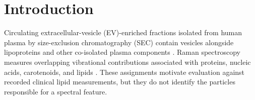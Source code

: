 \documentclass[preprint,12pt]{elsarticle}
\begin{document}
\section{Introduction}
\label{sec:introduction}

Circulating extracellular-vesicle (EV)-enriched fractions isolated from human plasma by size-exclusion chromatography (SEC) contain vesicles alongside lipoproteins and other co-isolated plasma components \cite{welsh2024, koster2021}. Raman spectroscopy measures overlapping vibrational contributions associated with proteins, nucleic acids, carotenoids, and lipids \cite{liu2025, czamara2015, bonizzi2025, gualerzi2019}. These assignments motivate evaluation against recorded clinical lipid measurements, but they do not identify the particles responsible for a spectral feature.
\end{document}
